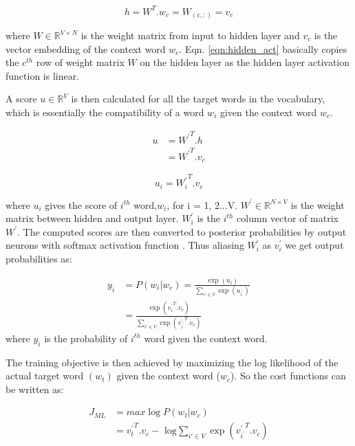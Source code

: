 \begin{equation}\label{eqn:hidden_act}
    h = W^T . w_c= W_{(c,:)}=v_{c}
\end{equation}

where $W {\in} \mathbb{R}^{V{\times}N}$ is the weight matrix from input to hidden layer and $v_{c}$ is the vector embedding of the context word $w_c$. Eqn. \ref{eqn:hidden_act} basically copies the $c^{th}$ row of weight matrix $W$ on the hidden layer as the hidden layer activation function is linear. 

A score $u {\in}\mathbb{R}^V$ is then calculated for all the target words in the vocabulary, which is essentially the compatibility of a word $w_i$ given the context word $w_c$.

\begin{equation}
\begin{split}
         u &={W^{'}} ^ T . h \\
              &= {W^{'}}^T. v_{c}    
\end{split}
\end{equation}

\begin{equation}
    u_i = {W^{'}_i}^T. v_{c}
\end{equation}

\noindent  where $u_i$ gives the score of $i^{th}$ word,$w_{i}$, for i = 1, 2...V. $W^{'}{\in} \mathbb{R}^{N{\times}V} $ is the weight matrix between hidden and output layer. ${W^{'}_i}$ is the $i^{th}$ column vector of matrix $W^{'}$.  
The computed scores are then converted to posterior probabilities by output neurons with softmax activation function \cite{w2v:parameter_learning}. Thus aliasing ${W^{'}_i}$ as $v^{'}_{i}$ we get output probabilities as: 

\begin{equation}
\begin{split}    
y_i &= P(w_i | w_c) = \frac {\exp(u_i)} {\sum_{i' {\in} V} \exp (u_{i^{'}})}\\
    &= \frac {\exp({v^{'}_{i}}^T.v_{c})}{\sum_{i' {\in} V}\exp({v^{'}_{i^{'}}}^T.v_{c})}
\end{split}
\end{equation}
where $y_i$ is the probability of $i^{th}$ word given the context word.

The training objective is then achieved by maximizing the log likelihood of the actual target word $(w_{t})$ given the context word ($w_{c}$). So the cost functions can be written as:

\begin{equation}
  \begin{split}
      J_{ML} &= max \log P(w_t | w_c) \\
           &= {v^{'}_{t}}^T.v_{c}- \text{ log} \sum_{i' {\in} V} {\exp({v^{'}_{i^{'}}}^T.v_{c})}
  \end{split}
\end{equation} 


